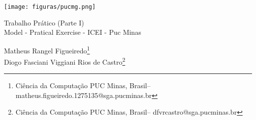 \documentclass[a4paper,12pt,Times]{article}
\makeatletter
\newcommand{\monog}{Trabalho Prático (Parte I)}
\newcommand{\monogES}{Model - Pratical Exercise - ICEI - Puc Minas}
\newcommand{\origem}{Brasil}
\newcommand{\AutorA}{Matheus Rangel Figueiredo}
\newcommand{\AutorB}{Diogo Fasciani Viggiani Rios de Castro}
\newcommand{\funcaoA}{}
\newcommand{\emailA}{matheus.figueiredo.1275135@sga.pucminas.br}
\newcommand{\emailA}{matheus.figueiredo.1275135@sga.pucminas.br}
\newcommand{\emailB}{dfvrcastro@sga.pucminas.br}
\newcommand{\cursA}{Ciência da Computação PUC Minas}
\newcommand{\cursB}{Ciência da Computação PUC Minas}
\newcommand{\keyword}[1]{\textsf{#1}}
\makeatother
\begin{document}

\begin{flushleft}

\begin{minipage} [c][5cm][b]{16.5cm} %
\texttt{[image: figuras/pucmg.png]} 
\end{minipage}

 \vspace{0cm} {
 \singlespacing \Large{\monog {} \\ }
  \normalsize{\monogES}
 }
\end{flushleft}
\begin{flushright}
\singlespacing 
\normalsize{\AutorA \footnote{\funcaoA \cursA, \origem -- \emailA }} \\
\normalsize{\AutorB \footnote{\funcaoB \cursB, \origem -- \emailB }} \\


\end{flushright}
\thispagestyle{empty}

\begin{abstract}
\noindent
Este exercício prático contem a documentação do trabalho prático I (Parte I), feita em \LaTeX. O programa é um sistema de cadastro de prontuários para uma empresa de planos de saúde. O menu de opções do programa é composto de 6 alternativas (sendo uma delas a opção de sair do programa), é possível: 1- criar um arquivo, 2- inserir registros, 3- editar registros, 4- remover registros, 5- imprimir os registros e 0- sair do programa. Todo o projeto foi desenvolvido na linguagem de programação java e tem autoria do grupo conforme exigido na documentação. O intuito do programa é facilitar o cadastro dos pacientes no sistema, é possível consultar toda a lista de pacientes cadastrados, cadastrar novos pacientes e fazer a exclusão dos mesmos, também é possível olhar informações inseridas no prontuário como nome (máximo de 20 bytes + 2 para o tamanho da string), sexo, cpf (máximo de 9 bytes + 2 para o tamanho da string), data de aniversário e as anotações medicas feitas para cada paciente.
\\\textbf{\keyword{Palavras-chave: }}\LaTeX. Exercício Prático. Java.
\end{abstract}
\end{document}
